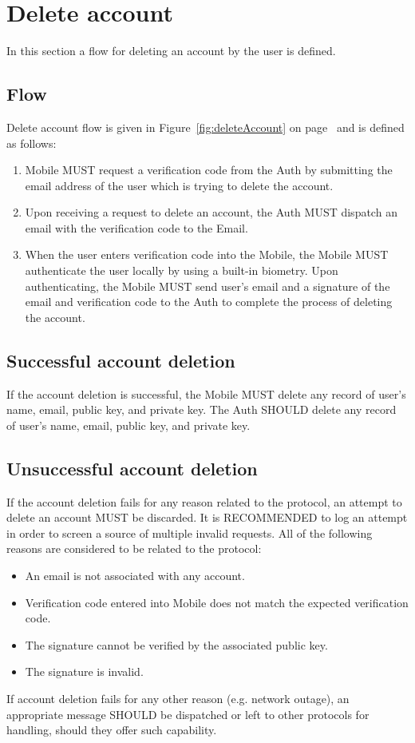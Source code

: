 \section{Delete account}
In this section a flow for deleting an account by the user is defined. 

    \subsection{Flow}
    Delete account flow is given in Figure~\ref{fig:deleteAccount} on page~\pageref{fig:deleteAccount} and is defined 
    as follows:
        \begin{enumerate}
            \item Mobile MUST request a verification code from the Auth by submitting the email address of the user
                  which is trying to delete the account.
            \item Upon receiving a request to delete an account, the Auth MUST dispatch an email with the verification
                  code to the Email.
            \item When the user enters verification code into the Mobile, the Mobile MUST authenticate the user locally 
                  by using a built-in biometry. Upon authenticating, the Mobile MUST send user's email and a signature 
                  of the email and verification code to the Auth to complete the process of deleting the account.
        \end{enumerate}
        
    
    \subsection{Successful account deletion}
    If the account deletion is successful, the Mobile MUST delete any record of user's name, email, public key, and 
    private key. The Auth SHOULD delete any record of user's name, email, public key, and private key.

    \subsection{Unsuccessful account deletion}
    If the account deletion fails for any reason related to the protocol, an attempt to delete an account MUST be 
    discarded. It is RECOMMENDED to log an attempt in order to screen a source of multiple invalid requests. 
    All of the following reasons are considered to be related to the protocol:
        \begin{itemize}
            \item An email is not associated with any account.
            \item Verification code entered into Mobile does not match the expected verification code.
            \item The signature cannot be verified by the associated public key.
            \item The signature is invalid.
        \end{itemize}
    If account deletion fails for any other reason (e.g. network outage), an appropriate message SHOULD be dispatched or 
    left to other protocols for handling, should they offer such capability.
